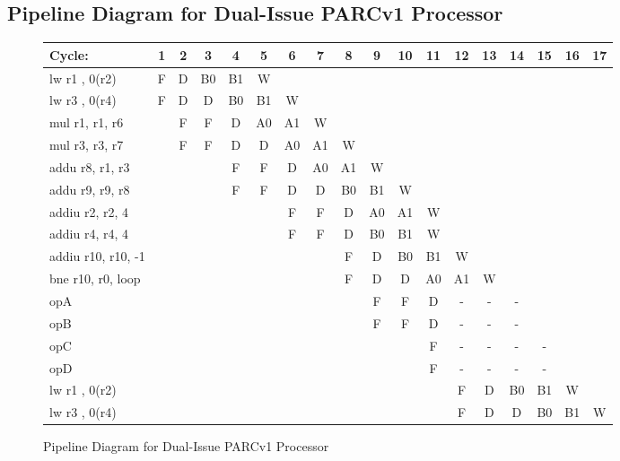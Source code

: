 \documentclass[10pt]{article}
\begin{document}
\subsection{Pipeline Diagram for Dual-Issue PARCv1 Processor}

\begin{figure}[H]
\centering
{\setlength{\tabcolsep}{2pt}
\begin{tabular}{|l|c|c|c|c!{\vrule width 1.5pt}c|c|c|c|c|c|c|c|c|c|c!{\vrule width 1.5pt}c|c|}
\hline
Cycle:            & 1  & 2  & 3  & 4  & 5  & 6  & 7  & 8  & 9  & 10 & 11 & 12 & 13 & 14 & 15 & 16 & 17 \\ \hline
lw r1 , 0(r2)     & F  & D  & B0 & B1 & W  &    &    &    &    &    &    &    &    &    &    &    &    \\ \hline
lw r3 , 0(r4)     & F  & D  & D  & B0 & B1 & W  &    &    &    &    &    &    &    &    &    &    &    \\ \hline
mul r1, r1, r6    &    & F  & F  & D  & A0 & A1 & W  &    &    &    &    &    &    &    &    &    &    \\ \hline
mul r3, r3, r7    &    & F  & F  & D  & D  & A0 & A1 & W  &    &    &    &    &    &    &    &    &    \\ \hline
addu r8, r1, r3   &    &    &    & F  & F  & D  & A0 & A1 & W  &    &    &    &    &    &    &    &    \\ \hline
addu r9, r9, r8   &    &    &    & F  & F  & D  & D  & B0 & B1 & W  &    &    &    &    &    &    &    \\ \hline
addiu r2, r2, 4   &    &    &    &    &    & F  & F  & D  & A0 & A1 & W  &    &    &    &    &    &    \\ \hline
addiu r4, r4, 4   &    &    &    &    &    & F  & F  & D  & B0 & B1 & W  &    &    &    &    &    &    \\ \hline
addiu r10, r10, -1&    &    &    &    &    &    &    & F  & D  & B0 & B1 & W  &    &    &    &    &    \\ \hline
bne r10, r0, loop &    &    &    &    &    &    &    & F  & D  & D  & A0 & A1 & W  &    &    &    &    \\ \hline
opA               &    &    &    &    &    &    &    &    & F  & F  & D  & -  & -  & -  &    &    &    \\ \hline
opB               &    &    &    &    &    &    &    &    & F  & F  & D  & -  & -  & -  &    &    &    \\ \hline
opC               &    &    &    &    &    &    &    &    &    &    & F  & -  & -  & -  & -  &    &    \\ \hline
opD               &    &    &    &    &    &    &    &    &    &    & F  & -  & -  & -  & -  &    &    \\ \hline
lw r1 , 0(r2)     &    &    &    &    &    &    &    &    &    &    &    & F  & D  & B0 & B1 & W  &    \\ \hline
lw r3 , 0(r4)     &    &    &    &    &    &    &    &    &    &    &    & F  & D  & D  & B0 & B1 & W  \\ \hline
\end{tabular}
}
\caption{Pipeline Diagram for Dual-Issue PARCv1 Processor}
\end{figure}
\end{document}
